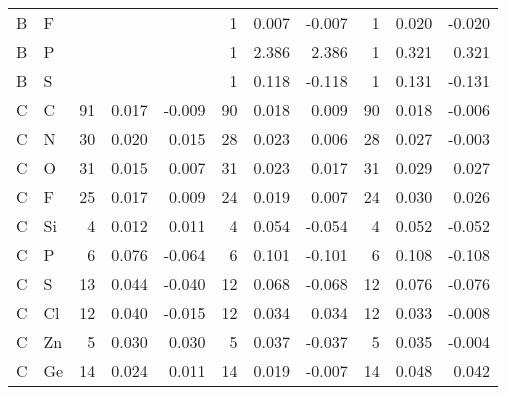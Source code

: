 \begin{table}
\begin{center}
\begin{tabular}{llrrrrrrrrr}
  B &   F &     &          &          &   1 &    0.007 &   -0.007 &   1 &    0.020 &   -0.020 \\
  B &   P &     &          &          &   1 &    2.386 &    2.386 &   1 &    0.321 &    0.321 \\
  B &   S &     &          &          &   1 &    0.118 &   -0.118 &   1 &    0.131 &   -0.131 \\
  C &   C &  91 &    0.017 &   -0.009 &  90 &    0.018 &    0.009 &  90 &    0.018 &   -0.006 \\
  C &   N &  30 &    0.020 &    0.015 &  28 &    0.023 &    0.006 &  28 &    0.027 &   -0.003 \\
  C &   O &  31 &    0.015 &    0.007 &  31 &    0.023 &    0.017 &  31 &    0.029 &    0.027 \\
  C &   F &  25 &    0.017 &    0.009 &  24 &    0.019 &    0.007 &  24 &    0.030 &    0.026 \\
  C &  Si &   4 &    0.012 &    0.011 &   4 &    0.054 &   -0.054 &   4 &    0.052 &   -0.052 \\
  C &   P &   6 &    0.076 &   -0.064 &   6 &    0.101 &   -0.101 &   6 &    0.108 &   -0.108 \\
  C &   S &  13 &    0.044 &   -0.040 &  12 &    0.068 &   -0.068 &  12 &    0.076 &   -0.076 \\
  C &  Cl &  12 &    0.040 &   -0.015 &  12 &    0.034 &    0.034 &  12 &    0.033 &   -0.008 \\
  C &  Zn &   5 &    0.030 &    0.030 &   5 &    0.037 &   -0.037 &   5 &    0.035 &   -0.004 \\
  C &  Ge &  14 &    0.024 &    0.011 &  14 &    0.019 &   -0.007 &  14 &    0.048 &    0.042 \\
\hline
\end{tabular}
\end{center}
\end{table}

